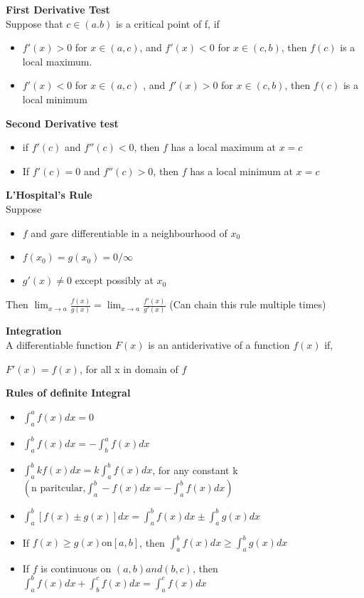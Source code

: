 \documentclass[10pt, a4paper]{article}
\begin{document}
\begin{multicols*}{3}
	\textbf{First Derivative Test}\\
	Suppose that $c \in (a. b)$ is a critical point of f, if
	\begin{itemize}
		\setlength\itemsep{0em}
		\item $f'(x) > 0$ for $x \in (a, c)$, and $f'(x) < 0$ for $x \in (c, b)$, then $f(c)$ is a local maximum.
		\item $f'(x) < 0$ for $x \in (a, c)$ , and $f'(x) > 0$ for $x \in (c, b)$, then $f(c)$ is a local minimum
	\end{itemize}
		 
	\textbf{Second Derivative test}
	\begin{itemize}
		\setlength\itemsep{0em}
		\item if $f'(c)$ and $f''(c) < 0$, then $f$ has a local maximum at $x = c$
		\item If $f'(c) = 0$ and $f''(c) > 0$, then $f$ has a local minimum at $x = c$
	\end{itemize}

	\textbf{L'Hospital's Rule}\\
	Suppose
	\begin{itemize}
		\setlength\itemsep{0em}
		\item $f$ and $g$are differentiable in a neighbourhood of $x_0$
		\item $f(x_0) = g(x_0) = 0 / \infty$
		\item $g'(x) \neq 0$ except possibly at $x_0$
	\end{itemize}
	Then $\lim_{x \to a} \frac{f(x)}{g(x)} = \lim_{x \to a} \frac{f'(x)}{g'(x)}$
	(Can chain this rule multiple times)
		
	{\normalsize\textbf{Integration}}\\
	A differentiable function $F(x)$ is an antiderivative of a function $f(x)$ if, 
	
    \centerline{$F'(x) = f(x)$, for all x in domain of $f$}
	
	\textbf{Rules of definite Integral}
	\begin{itemize}
		\setlength\itemsep{0em}
		\item $\int_{a}^{a} f(x) dx = 0$
		\item $\int_{a}^{b} f(x) dx = - \int_{b}^{a} f(x) dx$
		\item $\int_{a}^{b} kf(x) dx = k \int_{a}^{b} f(x)dx$, for any constant k\\ $\left( \text{n paritcular,} \int_{a}^{b} -f(x)dx = - \int_{a}^{b} f(x)dx \right)$
		\item $\int_{a}^{b} [f(x) \pm g(x)] dx = \int_{a}^{b} f(x)dx \pm \int_{a}^{b} g(x)dx$
		\item If $f(x) \geq g(x) \text{on} [a, b]$, then $ \int_{a}^{b} f(x)dx \geq \int_{a}^{b} g(x)dx$
		\item If $f$ is continuous on $(a, b) and (b, c)$, then\\ $\int_{a}^{b} f(x)dx + \int_{b}^{c} f(x)dx = \int_{a}^{c} f(x)dx$
	\end{itemize}


\end{multicols*}
\end{document}
